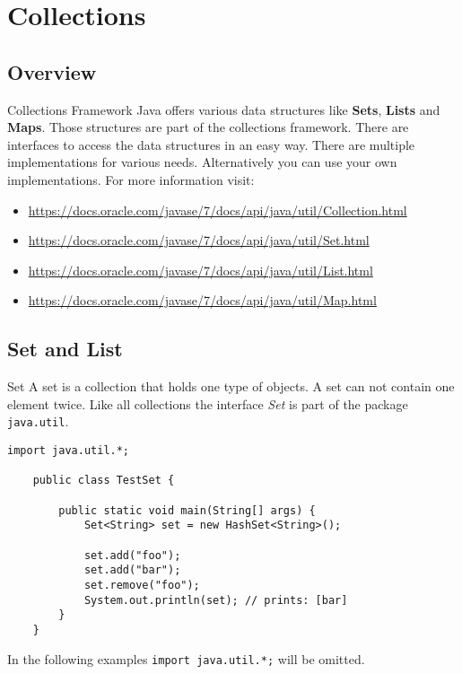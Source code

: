 \section{Collections}
\subsection{Overview}
\begin{frame}{Collections Framework}
	Java offers various data structures like \textbf{Sets}, \textbf{Lists} and \textbf{Maps}.
	Those structures are part of the collections framework.
	\vfill
	There are interfaces to access the data structures in an easy way.
	There are multiple implementations for various needs.
	Alternatively you can use your own implementations.
	\vfill
	For more information visit:
	\begin{itemize}
		\item \scriptsize\url{https://docs.oracle.com/javase/7/docs/api/java/util/Collection.html}
		\item \url{https://docs.oracle.com/javase/7/docs/api/java/util/Set.html}
		\item \url{https://docs.oracle.com/javase/7/docs/api/java/util/List.html}
		\item \url{https://docs.oracle.com/javase/7/docs/api/java/util/Map.html}
	\end{itemize}
\end{frame}

\subsection{Set and List}
\begin{frame}[fragile]{Set}
	A set is a collection that holds one type of objects.
	A set can not contain one element twice.
	Like all collections the interface \emph{Set} is part of the package \texttt{java.util}.
	\begin{lstlisting}[basicstyle=\ttfamily\scriptsize]
	import java.util.*;

	public class TestSet {
	    
	    public static void main(String[] args) {
	        Set<String> set = new HashSet<String>();
	    
	        set.add("foo");
	        set.add("bar");
	        set.remove("foo");
	        System.out.println(set); // prints: [bar]
	    }
	}
	\end{lstlisting}
	In the following examples \texttt{import java.util.*;} will be omitted.
\end{frame}

